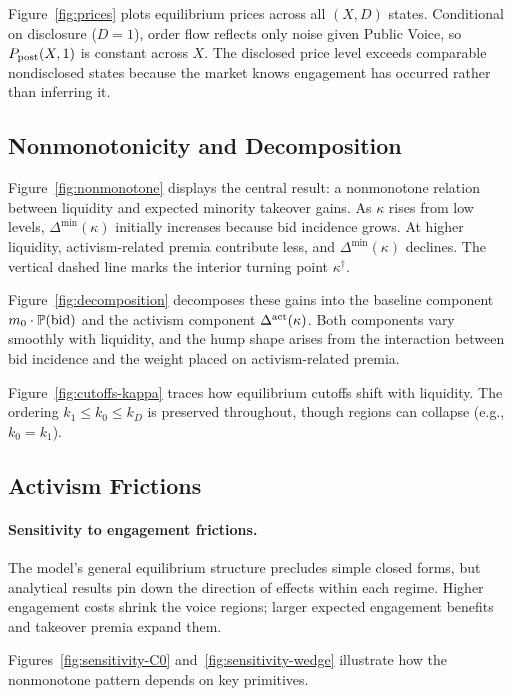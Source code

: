 \documentclass[11pt]{article}
\newcommand{\PP}{\mathbb{P}}
\newcommand{\1}{\mathbf{1}}
\begin{document}
Figure~\ref{fig:prices} plots equilibrium prices across all $(X,D)$ states. Conditional on disclosure ($D=1$), order flow reflects only noise given Public Voice, so $P_{\textup{post}}(X,1)$ is constant across $X$. The disclosed price level exceeds comparable nondisclosed states because the market knows engagement has occurred rather than inferring it.

%
\subsection{Nonmonotonicity and Decomposition}
%

Figure~\ref{fig:nonmonotone} displays the central result: a nonmonotone relation between liquidity and expected minority takeover gains. As $\kappa$ rises from low levels, $\Delta^{\min}(\kappa)$ initially increases because bid incidence grows. At higher liquidity, activism-related premia contribute less, and $\Delta^{\min}(\kappa)$ declines. The vertical dashed line marks the interior turning point $\kappa^{\dagger}$.

Figure~\ref{fig:decomposition} decomposes these gains into the baseline component $m_0 \cdot \PP(\textup{bid})$ and the activism component $\Delta^{\textup{act}}(\kappa)$. Both components vary smoothly with liquidity, and the hump shape arises from the interaction between bid incidence and the weight placed on activism-related premia.

Figure~\ref{fig:cutoffs-kappa} traces how equilibrium cutoffs shift with liquidity. The ordering $k_1 \le k_0 \le k_D$ is preserved throughout, though regions can collapse (e.g., $k_0=k_1$).

%
\subsection{Activism Frictions}
%

\paragraph{Sensitivity to engagement frictions.}
The model's general equilibrium structure precludes simple closed forms, but analytical results pin down the direction of effects within each regime. Higher engagement costs shrink the voice regions; larger expected engagement benefits and takeover premia expand them.

Figures~\ref{fig:sensitivity-C0} and~\ref{fig:sensitivity-wedge} illustrate how the nonmonotone pattern depends on key primitives.
\end{document}
